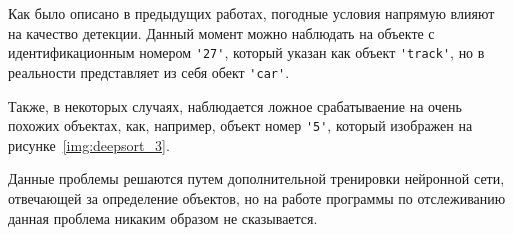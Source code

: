Как было описано в предыдущих работах, погодные условия напрямую влияют на качество детекции. Данный момент можно наблюдать на объекте с идентификационным номером \lstinline:'27':, который указан как объект \lstinline:'track':, но в реальности представляет из себя обект \lstinline:'car':.


Также, в некоторых случаях, наблюдается ложное срабатываение на очень похожих объектах, как, например, объект номер \lstinline:'5':, который изображен на рисунке~\ref{img:deepsort_3}.

Данные проблемы решаются путем дополнительной тренировки нейронной сети, отвечающей за определение объектов, но на работе программы по отслеживанию данная проблема никаким образом не сказывается. 